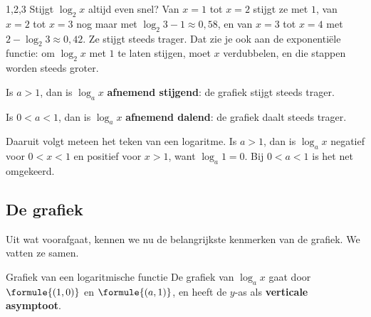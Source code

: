 \begin{alleenvoor}{1,2,3}
Stijgt $\log_2 x$ altijd even snel? Van $x = 1$ tot $x = 2$ stijgt ze met $1$, van $x = 2$ tot $x = 3$ nog maar met $\log_2 3 - 1 \approx 0{,}58$, en van $x = 3$ tot $x = 4$ met $2 - \log_2 3 \approx 0{,}42$. Ze stijgt steeds trager. Dat zie je ook aan de exponentiële functie: om $\log_2 x$ met $1$ te laten stijgen, moet $x$ verdubbelen, en die stappen worden steeds groter.

\begin{theorie}
Is $a > 1$, dan is $\log_a x$ \textbf{\textcolor{accent}{afnemend stijgend}}: de grafiek stijgt steeds trager.

Is $0 < a < 1$, dan is $\log_a x$ \textbf{\textcolor{accent}{afnemend dalend}}: de grafiek daalt steeds trager.
\end{theorie}

\end{alleenvoor}
Daaruit volgt meteen het teken van een logaritme. Is $a > 1$, dan is $\log_a x$ negatief voor $0 < x < 1$ en positief voor $x > 1$, want $\log_a 1 = 0$. Bij $0 < a < 1$ is het net omgekeerd.


\begin{oefeningen}
\end{oefeningen}

\subsection{De grafiek}

Uit wat voorafgaat, kennen we nu de belangrijkste kenmerken van de grafiek. We vatten ze samen.

\begin{theorie}
\begin{stelling}{Grafiek van een logaritmische functie}
De grafiek van $\log_a x$ gaat door $\formule{(1, 0)}$ en $\formule{(a, 1)}$, en heeft de $y$-as als \textbf{\textcolor{accent}{verticale asymptoot}}.
\end{stelling}
\end{theorie}

